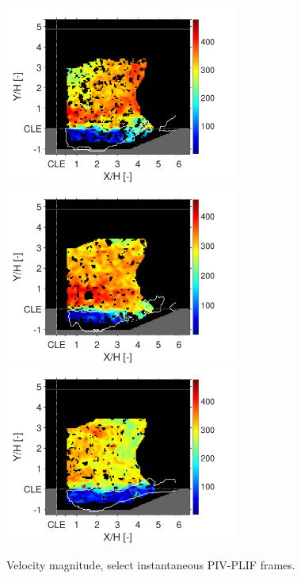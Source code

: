 \begin{figure}
                \hspace{0.4cm}
                {\includegraphics[width=3in,trim=0.35in 0 0.65in 0, clip]{figures/B1/combustion_instability/3/absolute_vel/B1_Frame339.pdf}}
                \newline
                {\includegraphics[width=3in,trim=0.35in 0 0.65in 0, clip]{figures/B1/combustion_instability/3/absolute_vel/B1_Frame306.pdf}}
                \hspace{0.4cm}
                {\includegraphics[width=3in,trim=0.35in 0 0.65in 0, clip]{figures/B1/combustion_instability/2/absolute_vel/B1_Frame301.pdf}}
\caption{Velocity magnitude, select instantaneous PIV-PLIF frames.}\label{fig:ch3_inst_B1}
\end{figure}

